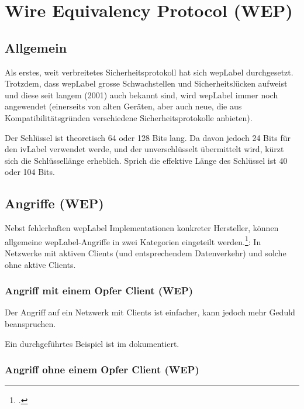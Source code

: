 \chapter{Wire Equivalency Protocol (WEP)}
\label{ch:wep}

\section{Allgemein}
Als erstes, weit verbreitetes Sicherheitsprotokoll hat sich \acrfull{wepLabel} durchgesetzt.
Trotzdem, dass \gls{wepLabel} grosse Schwachstellen und Sicherheitslücken aufweist und diese seit langem (2001) auch bekannt sind, wird \gls{wepLabel} immer noch angewendet (einerseits von alten Geräten, aber auch neue, die aus Kompatibilitätsgründen verschiedene Sicherheitsprotokolle anbieten).

Der Schlüssel ist theoretisch 64 oder 128 Bits lang.
Da davon jedoch 24 Bits für den \gls{ivLabel} verwendet werde, und der unverschlüsselt übermittelt wird, kürzt sich die Schlüssellänge erheblich.
Sprich die effektive Länge des Schlüssel ist 40 oder 104 Bits.

\section{Angriffe (WEP)}
Nebst fehlerhaften \gls{wepLabel} Implementationen konkreter Hersteller, können allgemeine \gls{wepLabel}-Angriffe in zwei Kategorien eingeteilt werden.\footcite[][126f.]{WrightCache201503}:
In Netzwerke mit aktiven Clients (und entsprechendem Datenverkehr) und solche ohne aktive Clients.

\subsection{Angriff mit einem Opfer Client (WEP)}
Der Angriff auf ein Netzwerk mit Clients ist einfacher, kann jedoch mehr Geduld beanspruchen.

Ein durchgeführtes Beispiel ist im  dokumentiert.





\subsection{Angriff ohne einem Opfer Client (WEP)}

